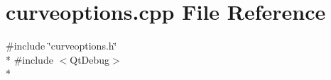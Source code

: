 \section{curveoptions.\+cpp File Reference}
\label{curveoptions_8cpp}
{\ttfamily \#include \char`\"{}curveoptions.\+h\char`\"{}}\\*
{\ttfamily \#include $<$Qt\+Debug$>$}\\*
